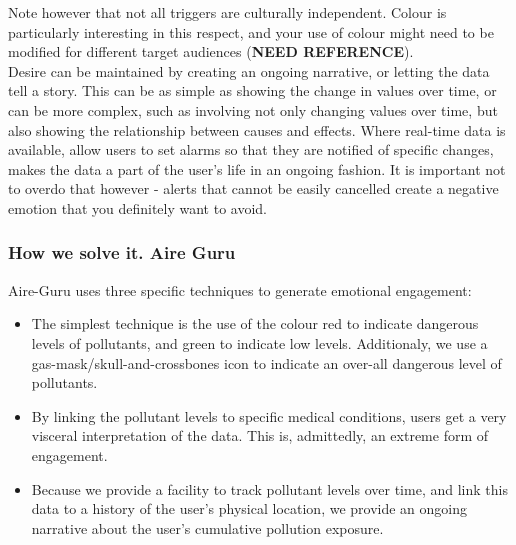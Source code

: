 Note however that not all triggers are culturally independent. Colour is particularly interesting in this respect, and your use of colour might
need to be modified for different target audiences (\textbf{NEED REFERENCE}). \\

Desire can be maintained by creating an ongoing narrative, or letting the data tell a story. This can be as simple as showing the change in 
values over time, or can be more complex, such as involving not only changing values over time, but also showing the relationship between causes and
effects. Where real-time data is available, allow users to set alarms so that they are notified of specific changes, makes the data a part of the user's
life in an ongoing fashion. It is important not to overdo that however - alerts that cannot be easily cancelled create a negative emotion that you
definitely want to avoid. \\

\subsubsection{How we solve it. Aire Guru}

Aire-Guru uses three specific techniques to generate emotional engagement:

\begin{itemize}

    \item The simplest technique is the use of the colour red to indicate dangerous levels of pollutants, and green to indicate low levels.
    Additionaly, we use a gas-mask/skull-and-crossbones icon to indicate an over-all dangerous level of pollutants.

    \item By linking the pollutant levels to specific medical conditions, users get a very visceral interpretation of the data. This is, admittedly, an
    extreme form of engagement.
    
    \item Because we provide a facility to track pollutant levels over time, and link this data to a history of the user's physical location, we provide
    an ongoing narrative about the user's cumulative pollution exposure.

\end{itemize}


\begin{itemize}
    \done
    \crossed
\end{itemize}

\newpage